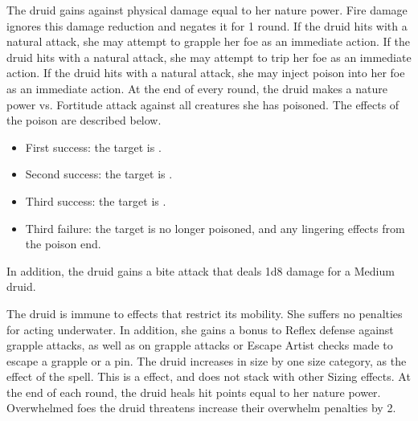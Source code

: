          The druid gains  against physical damage equal to her nature power.
        Fire damage ignores this damage reduction and negates it for 1 round.
        If the druid hits with a natural attack, she may attempt to grapple her foe as an immediate action.
        If the druid hits with a natural attack, she may attempt to trip her foe as an immediate action.
        If the druid hits with a natural attack, she may inject poison into her foe as an immediate action.
        At the end of every round, the druid makes a nature power vs. Fortitude attack against all creatures she has poisoned.
        The effects of the poison are described below.
        \begin{itemize}
            \item First success: the target is \sickened.
            \item Second success: the target is \staggered.
            \item Third success: the target is \nauseated.
            \item Third failure: the target is no longer poisoned, and any lingering effects from the poison end.
        \end{itemize}
        \par In addition, the druid gains a bite attack that deals 1d8 damage for a Medium druid.

         The druid is immune to effects that restrict its mobility. She suffers no penalties for acting underwater. In addition, she gains a  bonus to Reflex defense against grapple attacks, as well as on grapple attacks or Escape Artist checks made to escape a grapple or a pin.
        The druid increases in size by one size category, as the effect of the  spell.
        This is a  effect, and does not stack with other Sizing effects.
        At the end of each round, the druid heals hit points equal to her nature power.
        Overwhelmed foes the druid threatens increase their overwhelm penalties by 2.

